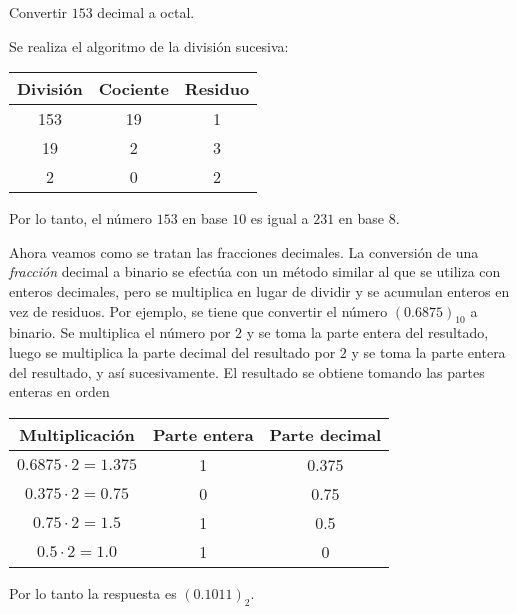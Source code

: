 \begin{ejemplo}
    Convertir $153$ decimal a octal.
\end{ejemplo}
\begin{solution}
    Se realiza el algoritmo de la división sucesiva:
    \begin{table}[H]
        \centering
        \begin{tabular}{c|c|c}
            \textbf{División} & \textbf{Cociente} & \textbf{Residuo} \\ \hline
            153               & 19                & 1                \\
            19                & 2                 & 3                \\
            2                 & 0                 & 2
        \end{tabular}
    \end{table}
    Por lo tanto, el número $153$ en base $10$ es igual a $231$ en base $8$.
\end{solution}
Ahora veamos como se tratan las fracciones decimales. \newline
La conversión de una \textit{fracción} decimal a binario se efectúa con un método similar al que se utiliza con enteros decimales, pero se multiplica en lugar de dividir y se acumulan enteros en vez de residuos.
Por ejemplo, se tiene que convertir el número $(0.6875)_{10}$ a binario. Se multiplica el número por $2$ y se toma la parte entera del resultado, luego se multiplica la parte decimal del resultado por $2$ y se toma la parte entera del resultado, y así sucesivamente. El resultado se obtiene tomando las partes enteras en orden
\begin{table}[H]
    \centering
    \begin{tabular}{c|c|c}
        \textbf{Multiplicación} & \textbf{Parte entera} & \textbf{Parte decimal} \\ \hline
        $0.6875 \cdot 2 = 1.375$ & 1                     & 0.375                  \\
        $0.375 \cdot 2 = 0.75$   & 0                     & 0.75                   \\
        $0.75 \cdot 2 = 1.5$     & 1                     & 0.5                    \\
        $0.5 \cdot 2 = 1.0$      & 1                     & 0
    \end{tabular}
\end{table}
Por lo tanto la respuesta es $(0.1011)_{2}$.

